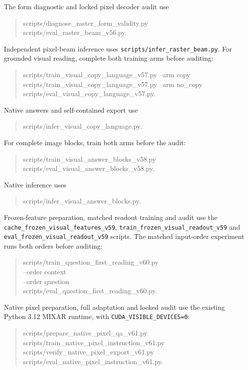 \documentclass[10pt,a4paper]{article}
\begin{document}
The form diagnostic and locked pixel decoder audit use
\begin{quote}\small\ttfamily
scripts/diagnose\_raster\_form\_validity.py\\
scripts/eval\_raster\_beam\_v56.py.
\end{quote}
Independent pixel-beam inference uses
\texttt{scripts/infer\_raster\_beam.py}.
For grounded visual reading, complete both training arms before auditing:
\begin{quote}\small\ttfamily
scripts/train\_visual\_copy\_language\_v57.py --arm copy\\
scripts/train\_visual\_copy\_language\_v57.py --arm no\_copy\\
scripts/eval\_visual\_copy\_language\_v57.py.
\end{quote}
Native answers and self-contained export use
\begin{quote}\small\ttfamily
scripts/infer\_visual\_copy\_language.py.
\end{quote}
For complete image blocks, train both arms before the audit:
\begin{quote}\small\ttfamily
scripts/train\_visual\_answer\_blocks\_v58.py\\
scripts/eval\_visual\_answer\_blocks\_v58.py.
\end{quote}
Native inference uses
\begin{quote}\small\ttfamily
scripts/infer\_visual\_answer\_blocks.py.
\end{quote}
Frozen-feature preparation, matched readout training and audit use the
\texttt{cache\_frozen\_visual\_features\_v59},
\texttt{train\_frozen\_visual\_readout\_v59} and
\texttt{eval\_frozen\_visual\_readout\_v59} scripts.
The matched input-order experiment runs both orders before auditing:
\begin{quote}\small\ttfamily
scripts/train\_question\_first\_reading\_v60.py\\
--order context\\
--order question\\
scripts/eval\_question\_first\_reading\_v60.py.
\end{quote}
Native pixel preparation, full adaptation and locked audit use the existing
Python 3.12 MIXAR runtime, with \texttt{CUDA\_VISIBLE\_DEVICES=0}:
\begin{quote}\small\ttfamily
scripts/prepare\_native\_pixel\_qa\_v61.py\\
scripts/train\_native\_pixel\_instruction\_v61.py\\
scripts/verify\_native\_pixel\_export\_v61.py\\
scripts/eval\_native\_pixel\_instruction\_v61.py.
\end{quote}
\end{document}

